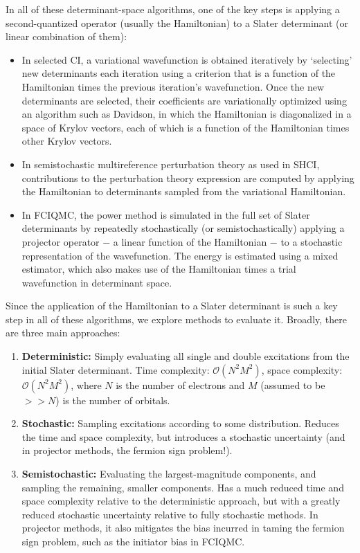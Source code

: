 \documentclass[english]{article}
\begin{document}
In all of these determinant-space algorithms, one of the key steps is applying a second-quantized operator (usually the Hamiltonian) to a Slater determinant (or linear combination of them):
\begin{itemize}
\item In selected CI, a variational wavefunction is obtained iteratively by `selecting' new determinants each iteration using a criterion that is a function of the Hamiltonian times the previous iteration's wavefunction. Once the new determinants are selected, their coefficients are variationally optimized using an algorithm such as Davidson, in which the Hamiltonian is diagonalized in a space of Krylov vectors, each of which is a function of the Hamiltonian times other Krylov vectors.
\item In semistochastic multireference perturbation theory as used in SHCI, contributions to the perturbation theory expression are computed by applying the Hamiltonian to determinants sampled from the variational Hamiltonian.
\item In FCIQMC, the power method is simulated in the full set of Slater determinants by repeatedly stochastically (or semistochastically) applying a projector operator $-$ a linear function of the Hamiltonian $-$ to a stochastic representation of the wavefunction. The energy is estimated using a mixed estimator, which also makes use of the Hamiltonian times a trial wavefunction in determinant space.
\end{itemize}

Since the application of the Hamiltonian to a Slater determinant is such a key step in all of these algorithms, we explore methods to evaluate it. Broadly, there are three main approaches:
\begin{enumerate}
	\item {\bf Deterministic:} Simply evaluating all single and double excitations from the initial Slater determinant. Time complexity: $\mathcal{O}(N^2 M^2)$, space complexity: $\mathcal{O}(N^2M^2)$, where $N$ is the number of electrons and $M$ (assumed to be $>>N$) is the number of orbitals.
	\item {\bf Stochastic:} Sampling excitations according to some distribution. Reduces the time and space complexity, but introduces a stochastic uncertainty (and in projector methods, the fermion sign problem!).
	\item {\bf Semistochastic:} Evaluating the largest-magnitude components, and sampling the remaining, smaller components. Has a much reduced time and space complexity relative to the deterministic approach, but with a greatly reduced stochastic uncertainty relative to fully stochastic methods. In projector methods, it also mitigates the bias incurred in taming the fermion sign problem, such as the initiator bias in FCIQMC.
\end{enumerate}
\end{document}
